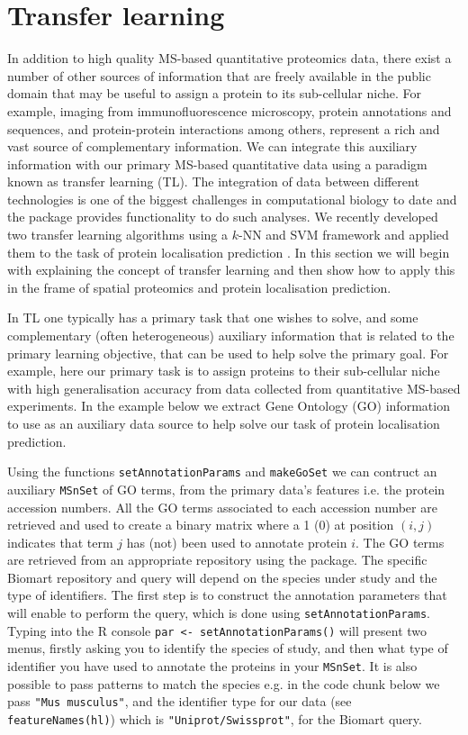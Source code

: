\clearpage

\section*{Transfer learning}

In addition to high quality MS-based quantitative proteomics data,
there exist a number of other sources of information that are freely
available in the public domain that may be useful to assign a protein
to its sub-cellular niche. For example, imaging from
immunofluorescence microscopy, protein annotations and sequences, and
protein-protein interactions among others, represent a rich and vast
source of complementary information. We can integrate this auxiliary
information with our primary MS-based quantitative data using a
paradigm known as transfer learning (TL). The integration of data
between different technologies is one of the biggest challenges in
computational biology to date and the  package
provides functionality to do such analyses. We recently developed two
transfer learning algorithms using a $k$-NN and SVM framework and
applied them to the task of protein localisation prediction
\cite{Breckels:2016}. In this section we will begin with explaining the
concept of transfer learning and then show how to apply this in the
frame of spatial proteomics and protein localisation prediction.

In TL one typically has a primary task that one wishes to solve, and
some complementary (often heterogeneous) auxiliary information that is
related to the primary learning objective, that can be used to help
solve the primary goal. For example, here our primary task is to
assign proteins to their sub-cellular niche with high generalisation
accuracy from data collected from quantitative MS-based experiments.
In the example below we extract Gene Ontology (GO) information to use
as an auxiliary data source to help solve our task of protein
localisation prediction.

Using the functions \texttt{setAnnotationParams} and
\texttt{makeGoSet} we can contruct an auxiliary \texttt{MSnSet} of GO
terms, from the primary data's features i.e. the protein accession
numbers. All the GO terms associated to each accession number are
retrieved and used to create a binary matrix where a 1 (0) at position
$(i, j)$ indicates that term $j$ has (not) been used to annotate
protein $i$. The GO terms are retrieved from an appropriate repository
using the  package. The specific Biomart repository
and query will depend on the species under study and the type of
identifiers. The first step is to construct the annotation parameters
that will enable to perform the query, which is done using
\texttt{setAnnotationParams}. Typing into the R console \texttt{par <-
  setAnnotationParams()} will present two menus, firstly asking you to
identify the species of study, and then what type of identifier you
have used to annotate the proteins in your \texttt{MSnSet}. It is also
possible to pass patterns to match the species e.g. in the code chunk
below we pass \texttt{"Mus musculus"}, and the identifier type for our
data (see \texttt{featureNames(hl)}) which is
\texttt{"Uniprot/Swissprot"}, for the Biomart query.

